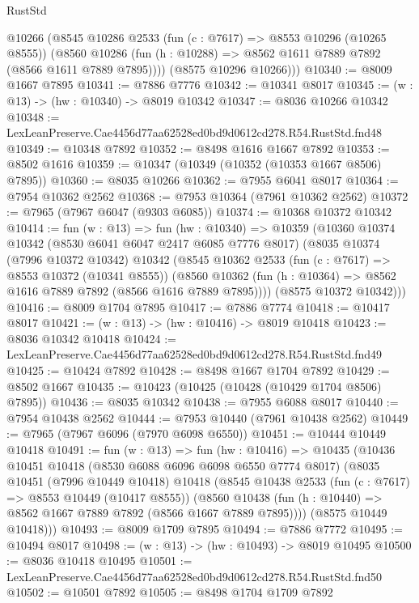 \begin{lexlean}{RustStd}
\begin{coremodule}
        @10266
        (@8545
          @10286
          @2533
          (fun (c : @7617) => @8553 @10296 (@10265 @8555))
          (@8560 @10286 (fun (h : @10288) => @8562 @1611 @7889 @7892 (@8566 @1611 @7889 @7895))))
        (@8575 @10296 @10266)))
@10340 := @8009 @1667 @7895
@10341 := @7886 @7776
@10342 := @10341 @8017
@10345 := (w : @13) -> (hw : @10340) -> @8019 @10342
@10347 := @8036 @10266 @10342
@10348 := LexLeanPreserve.Cae4456d77aa62528ed0bd9d0612cd278.R54.RustStd.fnd48
@10349 := @10348 @7892
@10352 := @8498 @1616 @1667 @7892
@10353 := @8502 @1616
@10359 := @10347 (@10349 (@10352 (@10353 @1667 @8506) @7895))
@10360 := @8035 @10266
@10362 := @7955 @6041 @8017
@10364 := @7954 @10362 @2562
@10368 := @7953 @10364 (@7961 @10362 @2562)
@10372 := @7965 (@7967 @6047 (@9303 @6085))
@10374 := @10368 @10372 @10342
@10414 := fun (w : @13) =>
  fun (hw : @10340) =>
  @10359
    (@10360
      @10374
      @10342
      (@8530 @6041 @6047 @2417 @6085 @7776 @8017)
      (@8035
        @10374
        (@7996 @10372 @10342)
        @10342
        (@8545
          @10362
          @2533
          (fun (c : @7617) => @8553 @10372 (@10341 @8555))
          (@8560 @10362 (fun (h : @10364) => @8562 @1616 @7889 @7892 (@8566 @1616 @7889 @7895))))
        (@8575 @10372 @10342)))
@10416 := @8009 @1704 @7895
@10417 := @7886 @7774
@10418 := @10417 @8017
@10421 := (w : @13) -> (hw : @10416) -> @8019 @10418
@10423 := @8036 @10342 @10418
@10424 := LexLeanPreserve.Cae4456d77aa62528ed0bd9d0612cd278.R54.RustStd.fnd49
@10425 := @10424 @7892
@10428 := @8498 @1667 @1704 @7892
@10429 := @8502 @1667
@10435 := @10423 (@10425 (@10428 (@10429 @1704 @8506) @7895))
@10436 := @8035 @10342
@10438 := @7955 @6088 @8017
@10440 := @7954 @10438 @2562
@10444 := @7953 @10440 (@7961 @10438 @2562)
@10449 := @7965 (@7967 @6096 (@7970 @6098 @6550))
@10451 := @10444 @10449 @10418
@10491 := fun (w : @13) =>
  fun (hw : @10416) =>
  @10435
    (@10436
      @10451
      @10418
      (@8530 @6088 @6096 @6098 @6550 @7774 @8017)
      (@8035
        @10451
        (@7996 @10449 @10418)
        @10418
        (@8545
          @10438
          @2533
          (fun (c : @7617) => @8553 @10449 (@10417 @8555))
          (@8560 @10438 (fun (h : @10440) => @8562 @1667 @7889 @7892 (@8566 @1667 @7889 @7895))))
        (@8575 @10449 @10418)))
@10493 := @8009 @1709 @7895
@10494 := @7886 @7772
@10495 := @10494 @8017
@10498 := (w : @13) -> (hw : @10493) -> @8019 @10495
@10500 := @8036 @10418 @10495
@10501 := LexLeanPreserve.Cae4456d77aa62528ed0bd9d0612cd278.R54.RustStd.fnd50
@10502 := @10501 @7892
@10505 := @8498 @1704 @1709 @7892

\end{coremodule}
\end{lexlean}
